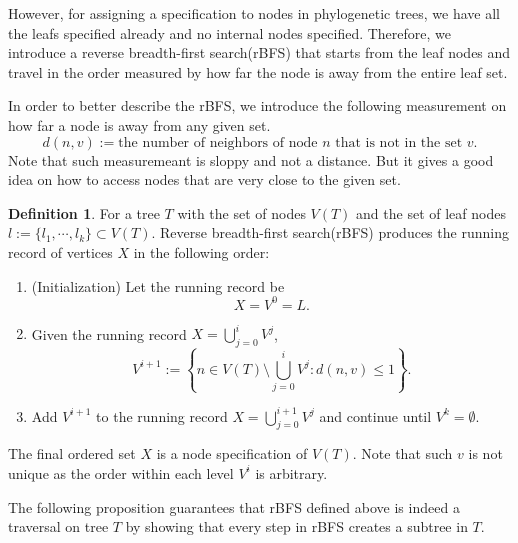 \documentclass[11pt]{article}
\theoremstyle{definition}
\newtheorem{defn}{Definition}[section]
\theoremstyle{remark}
\theoremstyle{plain}
\begin{document}
However, for assigning a specification to nodes in phylogenetic trees, we have all the leafs specified already and no internal nodes specified. Therefore, we introduce a reverse breadth-first search(rBFS) that starts from the leaf nodes and travel in the order measured by how far the node is away from the entire leaf set.

In order to better describe the rBFS, we introduce the following measurement on how far a node is away from any given set.
\begin{equation}
	d(n, v) := \text{the number of neighbors of node } n \text{ that is not in the set }v. 
\end{equation}
Note that such measuremeant is sloppy and not a distance. But it gives a good idea on how to access nodes that are very close to the given set.

\begin{defn}
	For a tree $T$ with the set of nodes $V(T)$ and the set of leaf nodes $l:=\{l_1,\cdots, l_k\}\subset V(T)$. Reverse breadth-first search(rBFS) produces the running record of vertices $X$ in the following order:
	\begin{enumerate}
		\item (Initialization) Let the running record be
		\[
			X = V^0 = L. 
		\]
		\item Given the running record $X = \bigcup_{j=0}^{i}V^j$, 
		\[
			V^{i+1} := \left\{n\in V(T)\setminus \bigcup_{j=0}^{i}V^j: d(n, v) \leq 1\right\}.
		\]
		\item Add $V^{i+1}$ to the running record $X = \bigcup_{j=0}^{i+1}V^j$ and continue until $V^{k} = \emptyset$.
	\end{enumerate}

	The final ordered set $X$ is a node specification of $V(T)$. Note that such $v$ is not unique as the order within each level $V^i$ is arbitrary.
\end{defn}

The following proposition guarantees that rBFS defined above is indeed a traversal on tree $T$ by showing that every step in rBFS creates a subtree in $T$.
\end{document}

